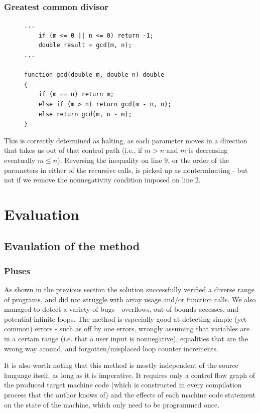 \documentclass[12pt,a4paper]{article}
\begin{document}
\subsubsection{Greatest common divisor}
\begin{minipage}{\textwidth}
\begin{figure}
\centering
\begin{lstlisting}[frame=tlrb,language=myLang]
...
	if (m <= 0 || n <= 0) return -1;
	double result = gcd(m, n);
...

function gcd(double m, double n) double
{
	if (m == n) return m;
	else if (m > n) return gcd(m - n, n);
	else return gcd(m, n - m);
}
\end{lstlisting}
\end{figure}
This is correctly determined as halting, as each parameter moves in a direction that takes us out of that control path (i.e., if $m > n$ and $m$ is decreasing eventually $m \leq n$).
Reversing the inequality on line $9$, or the order of the parameters in either of the recursive calls, is picked up as nonterminating - but not if we remove the nonnegativity condition
imposed on line $2$. 
\end{minipage}
\newpage
\begin{minipage}{\textwidth}
\section{Evaluation}
\end{minipage}
\subsection{Evaulation of the method}
\subsubsection{Pluses}
As shown in the previous section the solution successfully verified a diverse range of programs, and did not struggle with array usage and/or function calls.
We also managed to detect a variety of bugs - overflows, out of bounds accesses, and potential infinite loops. The method is especially good at detecting simple (yet common) errors - such as off by one errors, wrongly assuming that variables are in a certain range
(i.e. that a user input is nonnegative), equalities that are the wrong way around, and forgotten/misplaced loop counter increments.

It is also worth noting that this method is mostly independent of the source language itself, as long as it is imperative. It requires only a control flow graph of the produced target machine code (which is
constructed in every compilation process that the author knows of) and the effects of each machine code statement on the state of the machine, which only need to be programmed once.
\end{document}
